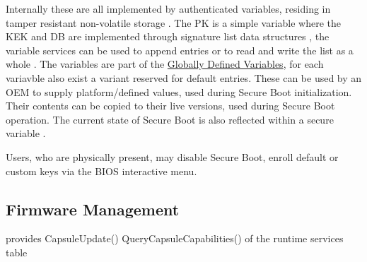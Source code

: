 Internally these are all implemented by authenticated variables, residing in tamper resistant non-volatile storage \cite[32.3]{uefi-spec}.
The \ac{PK} is a simple variable where the \ac{KEK} and \ac{DB} are implemented through signature list data structures \cite[32.4.1]{uefi-spec}, the variable services can be used to append entries or to read and write the list as a whole \cite[32.3.5 and 32.5.3]{uefi-spec}.
The variables are part of the \hyperref[sec:uefi-pi:uefi:variables]{Globally Defined Variables}, for each variavble also exist a variant reserved for default entries. These can be used by an \ac{OEM} to supply platform\-/defined values, used during Secure Boot initialization.
Their contents can be copied to their live versions, used during Secure Boot operation.
The current state of Secure Boot is also reflected within a secure variable \cite[3.3]{uefi-spec}.

Users, who are physically present, may disable Secure Boot, enroll default or custom keys via the \ac{BIOS} interactive menu. 


\subsection{Firmware Management}


provides
CapsuleUpdate()
QueryCapsuleCapabilities()
of the runtime services table